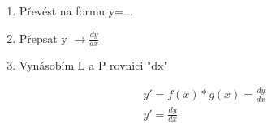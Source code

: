 \begin{enumerate}
  \item Převést na formu y=...
  \item Přepsat y $\rightarrow\frac{dy}{dx}$
  \item Vynásobím L a P rovnici "dx"
\end{enumerate}
\begin{align*}
  y'=f(x)*g(x)=\frac{dy}{dx}\\
  y'=\frac{dy}{dx}\\
\end{align*}

